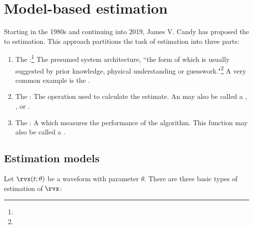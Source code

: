 \section{Model-based estimation}
\label{sec:model-based}
Starting in the 1980s and continuing into 2019, James V. Candy has proposed 
the  
to estimation. This approach partitions the task of estimation into three parts:
\begin{enumerate}
  \item The :\footnote{
          }
        The presumed system architecture,
        ``the form of which is usually suggested by prior knowledge, 
        physical understanding or guesswork."\footnote{}
        A very common example is the .
  \item The : 
        The operation used to calculate the estimate.
        An  may also be called a ,
        , or .
  \item The : 
        A  which measures the performance
        of the algorithm.
        This function may also be called a . 
\end{enumerate}

\subsection{Estimation models}
Let $\rvx(t;\theta)$ be a waveform with parameter $\theta$.
There are three basic types of estimation of $\rvx$:

